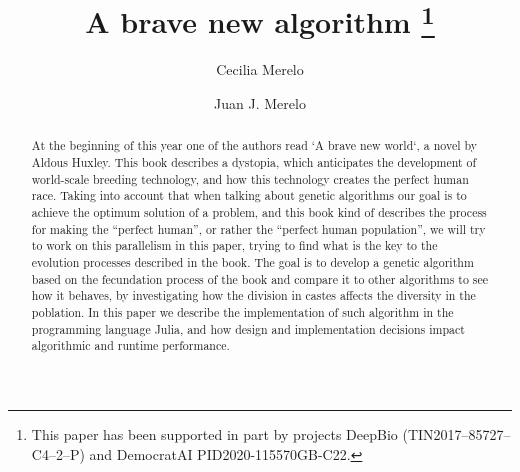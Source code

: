 \documentclass[runningheads]{llncs}
\begin{document}
%
\title{A brave new algorithm \thanks{This paper has been supported in part by projects DeepBio (TIN2017--85727--C4--2--P) and DemocratAI PID2020-115570GB-C22.}}
%
%
\author{Cecilia Merelo \and
Juan J. Merelo}
%
%
%
\maketitle              %
%
\begin{abstract}

At the beginning of this year one of the authors read `A brave new
world`, a novel by Aldous Huxley.  This book describes a dystopia,
which anticipates the development of world-scale breeding technology,
and how this technology creates the perfect human race. Taking into
account that when talking about genetic algorithms our goal is to
achieve the optimum solution of a problem, and this book kind of
describes the process for making the “perfect human”, or rather the
``perfect human population'', we will try to work on this parallelism
in this paper, trying to find what is the key to the evolution
processes described in the book. The goal is to develop a genetic
algorithm based on the fecundation process of the book and compare it
to other algorithms to see how it behaves, by investigating how the
division in castes affects the diversity in the poblation. In this
paper we describe the implementation of such algorithm in the
programming language Julia, and how design and implementation
decisions impact algorithmic and runtime performance.

\end{abstract}

% 








\end{document}
